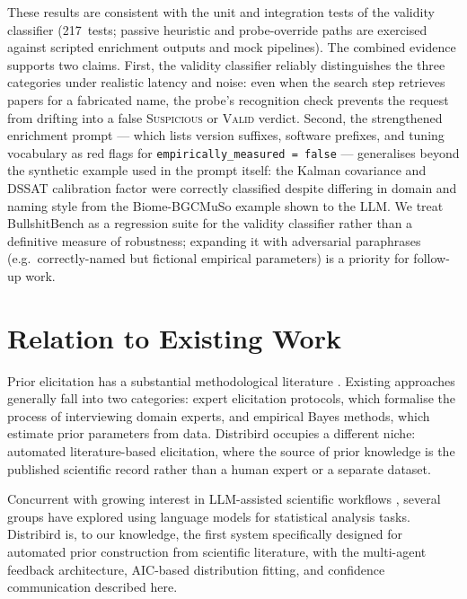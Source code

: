\documentclass[11pt,a4paper]{article}
\begin{document}
These results are consistent with the unit and integration tests of the validity classifier (217~tests; passive heuristic and probe-override paths are exercised against scripted enrichment outputs and mock pipelines). The combined evidence supports two claims. First, the validity classifier reliably distinguishes the three categories under realistic latency and noise: even when the search step retrieves papers for a fabricated name, the probe's recognition check prevents the request from drifting into a false \textsc{Suspicious} or \textsc{Valid} verdict. Second, the strengthened enrichment prompt --- which lists version suffixes, software prefixes, and tuning vocabulary as red flags for \texttt{empirically\_measured = false} --- generalises beyond the synthetic example used in the prompt itself: the Kalman covariance and DSSAT calibration factor were correctly classified despite differing in domain and naming style from the Biome-BGCMuSo example shown to the LLM. We treat BullshitBench as a regression suite for the validity classifier rather than a definitive measure of robustness; expanding it with adversarial paraphrases (e.g.\ correctly-named but fictional empirical parameters) is a priority for follow-up work.

\section{Relation to Existing Work}

Prior elicitation has a substantial methodological literature \citep{OHagan2006,Garthwaite2005}.
Existing approaches generally fall into two categories: expert elicitation protocols, which
formalise the process of interviewing domain experts, and empirical Bayes methods, which estimate
prior parameters from data. Distribird occupies a different niche: automated literature-based
elicitation, where the source of prior knowledge is the published scientific record rather than a
human expert or a separate dataset.

Concurrent with growing interest in LLM-assisted scientific workflows \citep{Boiko2023}, several
groups have explored using language models for statistical analysis tasks. Distribird is, to our
knowledge, the first system specifically designed for automated prior construction from scientific
literature, with the multi-agent feedback architecture, AIC-based distribution fitting, and
confidence communication described here.
\end{document}
